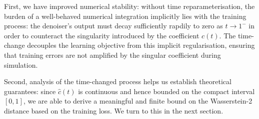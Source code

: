 First, we have improved numerical stability:  without time reparameterisation, the burden of a well-behaved numerical integration implicitly lies with the training process: the denoiser's output must decay sufficiently rapdily to zero as \(t \to 1^{-}\) in order to counteract the singularity introduced by the coefficient \(c(t)\). The time-change decouples the learning objective from this implicit regularisation, ensuring that training errors are not amplified by the singular coefficient during simulation.

Second, analysis of the time-changed process helps us establish theoretical guarantees: since \(\hat{c}(t)\) is continuous and hence bounded on the compact interval \([0, 1]\), we are able to derive a  meaningful and finite bound on the Wasserstein-2 distance based on the training loss. We turn to this in the next section.


